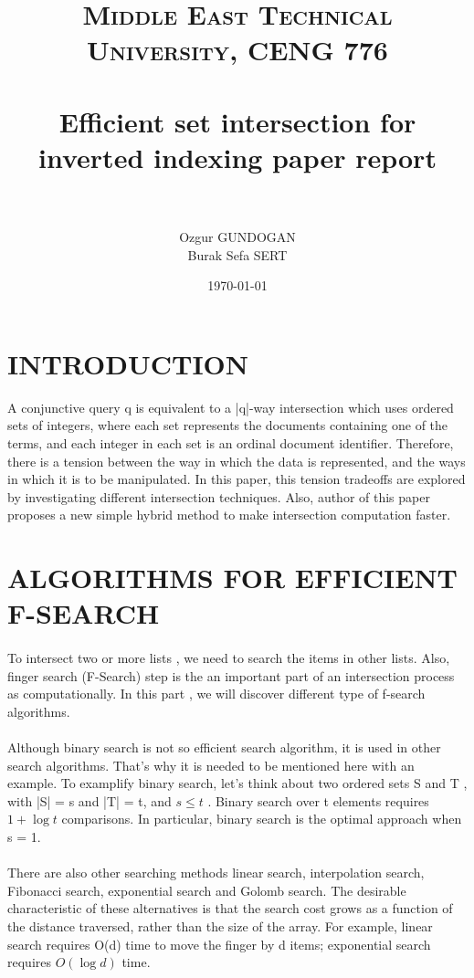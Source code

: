 \documentclass[paper=a4, fontsize=11pt]{scrartcl} %
\title{	
\normalfont \normalsize 
\textsc{Middle East Technical University, CENG 776} \\ [25pt] %
\horrule{0.5pt} \\[0.4cm] %
\huge Efficient set intersection for inverted indexing paper report \\ %
\horrule{2pt} \\[0.5cm] %
}
\author{Ozgur GUNDOGAN \\ Burak Sefa SERT} %
\date{\normalsize\today} %
\numberwithin{equation}{section} %
\numberwithin{figure}{section} %
\numberwithin{table}{section} %
\begin{document}
\maketitle %


\section{INTRODUCTION}

A conjunctive query q is equivalent to a |q|-way intersection which uses ordered sets of integers, where each set represents the documents containing one of the terms, and each integer in each set is an ordinal document identifier. Therefore, there is a tension between the way in which the data is represented, and the ways in which it is to be manipulated. In this paper, this tension tradeoffs are explored by investigating different intersection techniques. Also, author of this paper proposes a new simple hybrid method to make intersection computation faster.

\section{ALGORITHMS FOR EFFICIENT F-SEARCH}
\paragraph{}
To intersect two or more lists , we need to search the items in other lists. Also, finger search (F-Search) step is the an important part of an intersection process as computationally.  In this part , we will discover different type of f-search algorithms.
\paragraph{}
Although binary search is not so efficient search algorithm, it is used in other search algorithms. That's why it is needed to be mentioned here with an example. 
To examplify binary search, let's think about two ordered sets S and T , with |S| = s  and  |T| = t, and $s \leq t$ . Binary search over t elements requires $1+\log t$ comparisons. In particular, binary search is the optimal approach when s = 1.

\paragraph{}
There are also other searching methods linear search, interpolation search, Fibonacci search, exponential search and Golomb search. The desirable characteristic of these alternatives is that the search cost grows as a function of the distance traversed, rather than the size of the array. For example, linear search requires O(d) time to move the finger by d items; exponential search requires $O(\log d)$ time.
\end{document}
